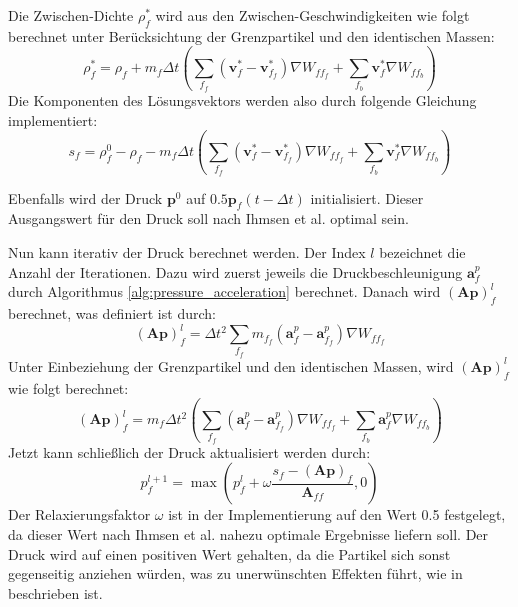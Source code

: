 \documentclass[11pt,
a4paper,
parskip=half, %
BCOR=10mm, %
english,
ngerman]{scrreprt}
\begin{document}
Die Zwischen-Dichte $\rho_f^*$ wird aus den Zwischen-Geschwindigkeiten wie folgt berechnet unter Berücksichtung der Grenzpartikel und den identischen Massen:
\begin{equation}
    \rho_f^* = \rho_f + m_f \Delta t \left(\sum_{f_f}(\textbf{v}_f^* - \textbf{v}_{f_f}^*) \nabla W_{ff_f} + \sum_{f_b}\textbf{v}_f^* \nabla W_{ff_b}\right)
\end{equation}
Die Komponenten des Lösungsvektors werden also durch folgende Gleichung implementiert:
\begin{equation}
    s_f = \rho_f^0 - \rho_f - m_f \Delta t \left(\sum_{f_f}(\textbf{v}_f^* - \textbf{v}_{f_f}^*) \nabla W_{ff_f} + \sum_{f_b}\textbf{v}_f^* \nabla W_{ff_b}\right)
\end{equation}

Ebenfalls wird der Druck $\textbf{p}^0$ auf $0.5 \textbf{p}_f(t-\Delta t)$ initialisiert.
Dieser Ausgangswert für den Druck soll nach Ihmsen et al. \cite{ihmsen_implicit_2014} optimal sein.

Nun kann iterativ der Druck berechnet werden.
Der Index $l$ bezeichnet die Anzahl der Iterationen.
Dazu wird zuerst jeweils die Druckbeschleunigung $\textbf{a}_f^p$ durch Algorithmus \ref{alg:pressure_acceleration} berechnet.
Danach wird $(\textbf{A}\textbf{p})_f^l$ berechnet, was definiert ist durch:
\begin{equation}
    (\textbf{A}\textbf{p})_f^l = \Delta t^2 \sum_{f_f} m_{f_f} (\textbf{a}_f^p - \textbf{a}_{f_f}^p) \nabla W_{ff_f}
\end{equation}
Unter Einbeziehung der Grenzpartikel und den identischen Massen, wird $(\textbf{A}\textbf{p})_f^l$ wie folgt berechnet:
\begin{equation}
    (\textbf{A}\textbf{p})_f^l = m_f \Delta t^2\left(\sum_{f_f}(\textbf{a}_f^p - \textbf{a}_{f_f}^p) \nabla W_{ff_f} + \sum_{f_b}\textbf{a}_f^p \nabla W_{ff_b}\right)
\end{equation}
Jetzt kann schließlich der Druck aktualisiert werden durch:
\begin{equation}
    p_f^{l+1} = \max(p_f^l + \omega \frac{s_f - (\textbf{A}\textbf{p})_f}{\textbf{A}_{ff}}, 0)
\end{equation}
Der Relaxierungsfaktor $\omega$ ist in der Implementierung auf den Wert 0.5 festgelegt,
da dieser Wert nach Ihmsen et al. \cite{ihmsen_implicit_2014} nahezu optimale Ergebnisse liefern soll.
Der Druck wird auf einen positiven Wert gehalten, da die Partikel sich sonst gegenseitig anziehen würden,
was zu unerwünschten Effekten führt, wie in \cite{ihmsen_implicit_2014} beschrieben ist.
\end{document}
